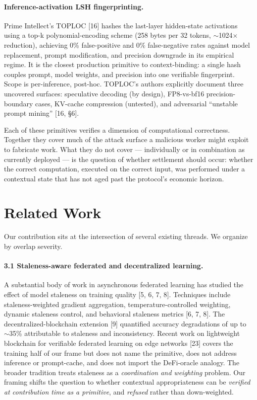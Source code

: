 \documentclass[11pt]{article}
\begin{document}
\paragraph{Inference-activation LSH fingerprinting.} Prime Intellect's TOPLOC [16] hashes the last-layer hidden-state activations using a top-k polynomial-encoding scheme (258 bytes per 32 tokens, $\sim$1024$\times$ reduction), achieving 0\% false-positive and 0\% false-negative rates against model replacement, prompt modification, and precision downgrade in its empirical regime. It is the closest production primitive to context-binding: a single hash couples prompt, model weights, and precision into one verifiable fingerprint. Scope is per-inference, post-hoc. TOPLOC's authors explicitly document three uncovered surfaces: speculative decoding (by design), FP8-vs-bf16 precision-boundary cases, KV-cache compression (untested), and adversarial ``unstable prompt mining'' [16, \S6].

Each of these primitives verifies a dimension of computational correctness. Together they cover much of the attack surface a malicious worker might exploit to fabricate work. What they do not cover --- individually or in combination as currently deployed --- is the question of whether settlement should occur: whether the correct computation, executed on the correct input, was performed under a contextual state that has not aged past the protocol's economic horizon.

\section{Related Work}

Our contribution sits at the intersection of several existing threads. We organize by overlap severity.

\paragraph{3.1 Staleness-aware federated and decentralized learning.} A substantial body of work in asynchronous federated learning has studied the effect of model staleness on training quality [5, 6, 7, 8]. Techniques include staleness-weighted gradient aggregation, temperature-controlled weighting, dynamic staleness control, and behavioral staleness metrics [6, 7, 8]. The decentralized-blockchain extension [9] quantified accuracy degradations of up to $\sim$35\% attributable to staleness and inconsistency. Recent work on lightweight blockchain for verifiable federated learning on edge networks [23] covers the training half of our frame but does not name the primitive, does not address inference or prompt-cache, and does not import the DeFi-oracle analogy. The broader tradition treats staleness as a \emph{coordination and weighting} problem. Our framing shifts the question to whether contextual appropriateness can be \emph{verified at contribution time as a primitive}, and \emph{refused} rather than down-weighted.
\end{document}

